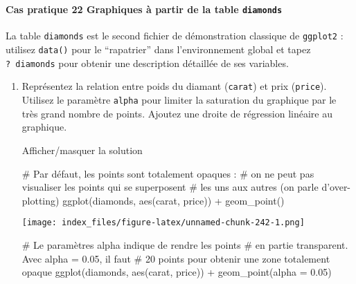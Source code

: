 \documentclass[12pt,]{article}
\newenvironment{Shaded}{}{}
\newcommand{\KeywordTok}[1]{\textcolor[rgb]{0.00,0.00,1.00}{{#1}}}
\newcommand{\DataTypeTok}[1]{{#1}}
\newcommand{\FloatTok}[1]{{#1}}
\newcommand{\StringTok}[1]{\textcolor[rgb]{0.00,0.50,0.50}{{#1}}}
\newcommand{\CommentTok}[1]{\textcolor[rgb]{0.00,0.50,0.00}{{#1}}}
\newcommand{\NormalTok}[1]{{#1}}
\let\oldparagraph\paragraph
\renewcommand{\paragraph}[1]{\oldparagraph{#1}\mbox{}}
\begin{document}
~

\paragraph{\texorpdfstring{\textbf{Cas pratique 22} Graphiques à partir
de la table
\texttt{diamonds}}{Cas pratique 22 Graphiques à partir de la table diamonds}}\label{cas-pratique-22-graphiques-a-partir-de-la-table-diamonds}

La table \texttt{diamonds} est le second fichier de démonstration
classique de \texttt{ggplot2} : utilisez \texttt{data()} pour le
``rapatrier'' dans l'environnement global et tapez \texttt{?\ diamonds}
pour obtenir une description détaillée de ses variables.

\begin{enumerate}
\def\labelenumi{\alph{enumi}.}
\item
  Représentez la relation entre poids du diamant (\texttt{carat}) et
  prix (\texttt{price}). Utilisez le paramètre \texttt{alpha} pour
  limiter la saturation du graphique par le très grand nombre de points.
  Ajoutez une droite de régression linéaire au graphique.

  Afficher/masquer la solution

  \hypertarget{sol66}{}
\begin{Shaded}
\begin{Highlighting}[]
\CommentTok{# Par défaut, les points sont totalement opaques : }
\CommentTok{# on ne peut pas visualiser les points qui se superposent}
\CommentTok{# les uns aux autres (on parle d'over-plotting)}
\KeywordTok{ggplot}\NormalTok{(diamonds, }\KeywordTok{aes}\NormalTok{(carat, price)) +}\StringTok{ }\KeywordTok{geom_point}\NormalTok{()}
\end{Highlighting}
\end{Shaded}

  \texttt{[image: index\_files/figure-latex/unnamed-chunk-242-1.png]}

\begin{Shaded}
\begin{Highlighting}[]

\CommentTok{# Le paramètres alpha indique de rendre les points}
\CommentTok{# en partie transparent. Avec alpha = 0.05, il faut}
\CommentTok{# 20 points pour obtenir une zone totalement opaque}
\KeywordTok{ggplot}\NormalTok{(diamonds, }\KeywordTok{aes}\NormalTok{(carat, price)) +}\StringTok{ }\KeywordTok{geom_point}\NormalTok{(}\DataTypeTok{alpha =} \FloatTok{0.05}\NormalTok{)}
\end{Highlighting}
\end{Shaded}


\end{enumerate}
\end{document}
